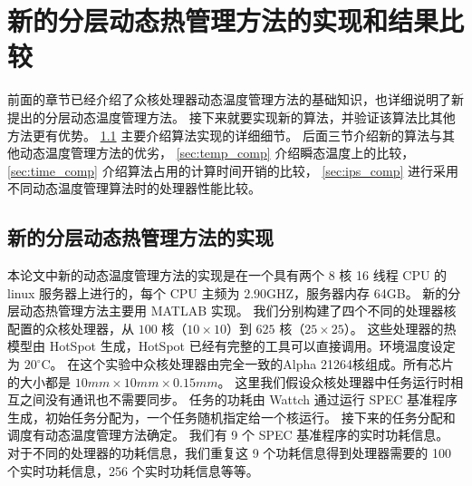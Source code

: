 
\chapter{新的分层动态热管理方法的实现和结果比较}\label{sec:exp}

前面的章节已经介绍了众核处理器动态温度管理方法的基础知识，也详细说明了新提出的分层动态温度管理方法。
接下来就要实现新的算法，并验证该算法比其他方法更有优势。
 \ref{sec:method_implement} 主要介绍算法实现的详细细节。 后面三节介绍新的算法与其他动态温度管理方法的优劣， \ref{sec:temp_comp} 介绍瞬态温度上的比较， \ref{sec:time_comp} 介绍算法占用的计算时间开销的比较，
 \ref{sec:ips_comp} 进行采用不同动态温度管理算法时的处理器性能比较。
\section{新的分层动态热管理方法的实现}\label{sec:method_implement}
本论文中新的动态温度管理方法的实现是在一个具有两个 8 核 16 线程 CPU 的 linux 服务器上进行的，每个 CPU 主频为 2.90GHZ，服务器内存 64GB。
新的分层动态热管理方法主要用 MATLAB 实现。
我们分别构建了四个不同的处理器核配置的众核处理器，从 $100$ 核（$10 \times 10$）到 $625$ 核（$25 \times 25$）。
这些处理器的热模型由 HotSpot 生成，HotSpot 已经有完整的工具可以直接调用。环境温度设定为 $20^{\circ}$C。
在这个实验中众核处理器由完全一致的Alpha 21264核组成。所有芯片的大小都是 $10mm \times 10mm \times 0.15mm$。
这里我们假设众核处理器中任务运行时相互之间没有通讯也不需要同步。
任务的功耗由 Wattch 通过运行 SPEC 基准程序  \cite{Henning:IEEEC'00} 生成，初始任务分配为，一个任务随机指定给一个核运行。
接下来的任务分配和调度有动态温度管理方法确定。
我们有 9 个 SPEC 基准程序的实时功耗信息。
对于不同的处理器的功耗信息，我们重复这 9 个功耗信息得到处理器需要的 100 个实时功耗信息，256 个实时功耗信息等等。

